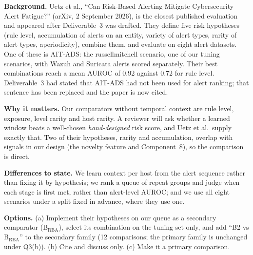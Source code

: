\documentclass[10.5pt,a4paper]{article}
\newcommand{\sub}[1]{\par\smallskip\noindent\textbf{#1}\quad}
\begin{document}
\sub{Background.} Uetz et al., ``Can Risk-Based Alerting Mitigate Cybersecurity Alert Fatigue?'' (arXiv, 2 September 2026), is the closest published evaluation and appeared after Deliverable~3 was drafted. They define five risk hypotheses (rule level, accumulation of alerts on an entity, variety of alert types, rarity of alert types, aperiodicity), combine them, and evaluate on eight alert datasets. One of these is AIT-ADS: the russellmitchell scenario, one of our tuning scenarios, with Wazuh and Suricata alerts scored separately. Their best combinations reach a mean AUROC of 0.92 against 0.72 for rule level. Deliverable~3 had stated that AIT-ADS had not been used for alert ranking; that sentence has been replaced and the paper is now cited.

\sub{Why it matters.} Our comparators without temporal context are rule level, exposure, level rarity and host rarity. A reviewer will ask whether a learned window beats a well-chosen \emph{hand-designed} risk score, and Uetz et al.\ supply exactly that. Two of their hypotheses, rarity and accumulation, overlap with signals in our design (the novelty feature and Component~8), so the comparison is direct.

\sub{Differences to state.} We learn context per host from the alert sequence rather than fixing it by hypothesis; we rank a queue of repeat groups and judge when each stage is first met, rather than alert-level AUROC; and we use all eight scenarios under a split fixed in advance, where they use one.

\sub{Options.} (a) Implement their hypotheses on our queue as a secondary comparator (B$_\mathrm{RBA}$), select its combination on the tuning set only, and add ``B2 vs B$_\mathrm{RBA}$'' to the secondary family (12 comparisons; the primary family is unchanged under Q3(b)). (b) Cite and discuss only. (c) Make it a primary comparison.
\end{document}
